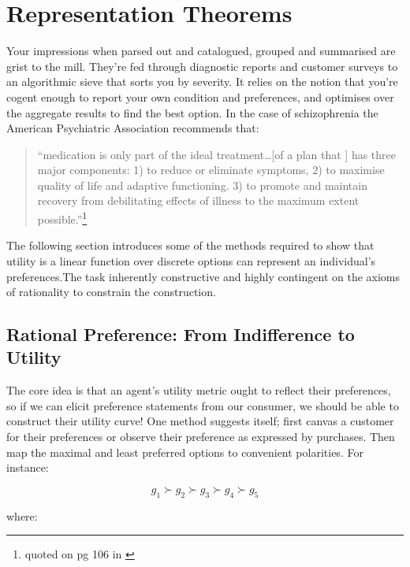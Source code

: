 \documentclass[]{tufte-book}
\theoremstyle{definition}
\theoremstyle{definition}
\theoremstyle{definition}
\theoremstyle{remark}
\begin{document}
\hypertarget{representation-theorems}{%
\section{Representation Theorems}\label{representation-theorems}}

Your impressions when parsed out and catalogued, grouped and summarised are grist to the mill. They're fed through diagnostic reports and customer surveys to an algorithmic sieve that sorts you by severity. It relies on the notion that you're cogent enough to report your own condition and preferences, and optimises over the aggregate results to find the best option. In the case of schizophrenia the American Psychiatric Association recommends that:

\begin{quote}
``medication is only part of the ideal treatment\ldots{[}of a plan that {]} has three major components: 1) to reduce or eliminate symptoms, 2) to maximise quality of life and adaptive functioning. 3) to promote and maintain recovery from debilitating effects of illness to the maximum extent possible.''\footnote{quoted on pg 106 in \citep{WangSchizophrenia}}
\end{quote}

The following section introduces some of the methods required to show that utility is a linear function over discrete options can represent an individual's preferences.The task inherently constructive and highly contingent on the axioms of rationality to constrain the construction.

\hypertarget{rational-preference-from-indifference-to-utility}{%
\subsection{Rational Preference: From Indifference to Utility}\label{rational-preference-from-indifference-to-utility}}

The core idea is that an agent's utility metric ought to reflect their preferences, so if we can elicit preference statements from our consumer, we should be able to construct their utility curve! One method suggests itself; first canvas a customer for their preferences or observe their preference as expressed by purchases. Then map the maximal and least preferred options to convenient polarities. For instance:

\[ g_{1} \succ g_{2} \succ g_{3} \succ g_{4} \succ g_{5} \]

where:
\end{document}
